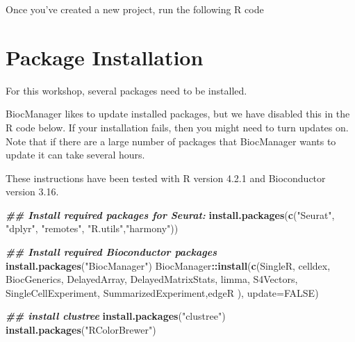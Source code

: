 \documentclass[
]{book}
\newenvironment{Shaded}{\begin{snugshade}}{\end{snugshade}}
\newcommand{\AttributeTok}[1]{\textcolor[rgb]{0.13,0.29,0.53}{#1}}
\newcommand{\ConstantTok}[1]{\textcolor[rgb]{0.56,0.35,0.01}{#1}}
\newcommand{\DocumentationTok}[1]{\textcolor[rgb]{0.56,0.35,0.01}{\textbf{\textit{#1}}}}
\newcommand{\FunctionTok}[1]{\textcolor[rgb]{0.13,0.29,0.53}{\textbf{#1}}}
\newcommand{\NormalTok}[1]{#1}
\newcommand{\SpecialCharTok}[1]{\textcolor[rgb]{0.81,0.36,0.00}{\textbf{#1}}}
\newcommand{\StringTok}[1]{\textcolor[rgb]{0.31,0.60,0.02}{#1}}
\begin{document}
Once you've created a new project, run the following R code

\section{Package Installation}\label{package-installation}

For this workshop, several packages need to be installed.

BiocManager likes to update installed packages, but we have disabled this in the R code below. If your installation fails, then you might need to turn updates on. Note that if there are a large number of packages that BiocManager wants to update it can take several hours.

These instructions have been tested with R version 4.2.1 and Bioconductor version 3.16.

\begin{Shaded}
\begin{Highlighting}[]
\DocumentationTok{\#\# Install required packages for Seurat:}
\FunctionTok{install.packages}\NormalTok{(}\FunctionTok{c}\NormalTok{(}\StringTok{"Seurat"}\NormalTok{, }\StringTok{"dplyr"}\NormalTok{, }\StringTok{"remotes"}\NormalTok{, }\StringTok{"R.utils"}\NormalTok{,}\StringTok{"harmony"}\NormalTok{))}

\DocumentationTok{\#\# Install required Bioconductor packages}
\FunctionTok{install.packages}\NormalTok{(}\StringTok{"BiocManager"}\NormalTok{)}
\NormalTok{BiocManager}\SpecialCharTok{::}\FunctionTok{install}\NormalTok{(}\FunctionTok{c}\NormalTok{(}\StringTok{\textquotesingle{}SingleR\textquotesingle{}}\NormalTok{, }\StringTok{\textquotesingle{}celldex\textquotesingle{}}\NormalTok{,}
                       \StringTok{\textquotesingle{}BiocGenerics\textquotesingle{}}\NormalTok{, }\StringTok{\textquotesingle{}DelayedArray\textquotesingle{}}\NormalTok{, }\StringTok{\textquotesingle{}DelayedMatrixStats\textquotesingle{}}\NormalTok{,}
                       \StringTok{\textquotesingle{}limma\textquotesingle{}}\NormalTok{, }\StringTok{\textquotesingle{}S4Vectors\textquotesingle{}}\NormalTok{, }\StringTok{\textquotesingle{}SingleCellExperiment\textquotesingle{}}\NormalTok{,}
                       \StringTok{\textquotesingle{}SummarizedExperiment\textquotesingle{}}\NormalTok{,}\StringTok{\textquotesingle{}edgeR\textquotesingle{}}\NormalTok{ ),}
                     \AttributeTok{update=}\ConstantTok{FALSE}\NormalTok{)}


\DocumentationTok{\#\# install clustree}
\FunctionTok{install.packages}\NormalTok{(}\StringTok{"clustree"}\NormalTok{)}
\FunctionTok{install.packages}\NormalTok{(}\StringTok{"RColorBrewer"}\NormalTok{)}
\end{Highlighting}
\end{Shaded}
\end{document}
